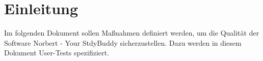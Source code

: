 
\chapter{Einleitung}
Im folgenden Dokument sollen Maßnahmen definiert werden, um die Qualität der Software Norbert - Your StdyBuddy sicherzustellen. Dazu werden in diesem Dokument User-Tests spezifiziert. \\ 





